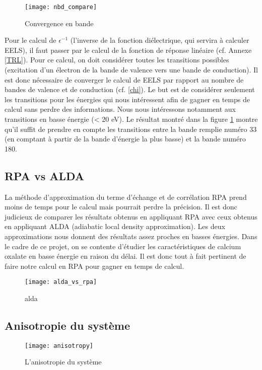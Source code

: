\begin{figure}[!h]\label{cv_nbd}
    \centering
    \texttt{[image: nbd\_compare]}
    \caption{Convergence en bande}
\end{figure}

Pour le calcul de $\epsilon^{-1}$ (l'inverse de la fonction diélectrique, qui servira à calculer EELS), il faut passer par le calcul de la fonction de réponse linéaire (cf. Annexe \ref{TRL}). 
Pour ce calcul, on doit considérer toutes les transitions possibles (excitation d'un électron de la bande de valence vers une bande de conduction). 
Il est donc nécessaire de converger le calcul de EELS par rapport au nombre de bandes de valence et de conduction (cf. \ref{chi}). 
Le but est de considérer seulement les transitions pour les énergies qui nous intéressent afin de gagner en temps de calcul sans perdre des informations. 
Nous nous intéressons notamment aux transitions en basse énergie (< 20 eV).
Le résultat montré dans la figure \ref{cv_nbd} montre qu'il suffit de prendre en compte les transitions entre la bande remplie numéro 33 (en comptant à partir de la bande d'énergie la plus basse) et la bande numéro 180. 


\subsection{RPA vs ALDA}
La méthode d'approximation du terme d'échange et de corrélation RPA prend moins de temps pour le calcul mais pourrait perdre la précision. Il est donc judicieux de comparer les résultats obtenus en appliquant RPA avec ceux obtenus en appliquant ALDA (adiabatic local density approximation).
Les deux approximations nous donnent des résultats assez proches en basses énergies.
Dans le cadre de ce projet, on se contente d'étudier les caractéristiques de calcium oxalate en basse énergie en raison du délai.
Il est donc tout à fait pertinent de faire notre calcul en RPA pour gagner en temps de calcul.
\begin{figure}[!h]
    \centering
    \texttt{[image: alda\_vs\_rpa]}
    \caption{alda}
\end{figure}
\subsection{Anisotropie du système}

\begin{figure}[!h]\label{anisotropie}
    \centering
    \texttt{[image: anisotropy]}
    \caption{L'anisotropie du système}
\end{figure}

